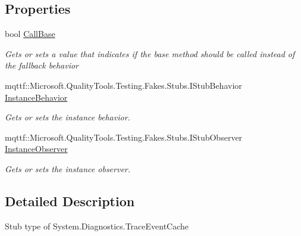 \subsection*{Properties}
\begin{DoxyCompactItemize}
\item 
bool \hyperlink{class_system_1_1_diagnostics_1_1_fakes_1_1_stub_trace_event_cache_aa416590351bffa357a1840dc81ac9293}{Call\-Base}
\begin{DoxyCompactList}\small\item\em Gets or sets a value that indicates if the base method should be called instead of the fallback behavior\end{DoxyCompactList}\item 
mqttf\-::\-Microsoft.\-Quality\-Tools.\-Testing.\-Fakes.\-Stubs.\-I\-Stub\-Behavior \hyperlink{class_system_1_1_diagnostics_1_1_fakes_1_1_stub_trace_event_cache_aebba5c60a0123a425d6c08371730c595}{Instance\-Behavior}
\begin{DoxyCompactList}\small\item\em Gets or sets the instance behavior.\end{DoxyCompactList}\item 
mqttf\-::\-Microsoft.\-Quality\-Tools.\-Testing.\-Fakes.\-Stubs.\-I\-Stub\-Observer \hyperlink{class_system_1_1_diagnostics_1_1_fakes_1_1_stub_trace_event_cache_a4ff74146dddb8b54a52dfdb06539b07b}{Instance\-Observer}
\begin{DoxyCompactList}\small\item\em Gets or sets the instance observer.\end{DoxyCompactList}\end{DoxyCompactItemize}


\subsection{Detailed Description}
Stub type of System.\-Diagnostics.\-Trace\-Event\-Cache




